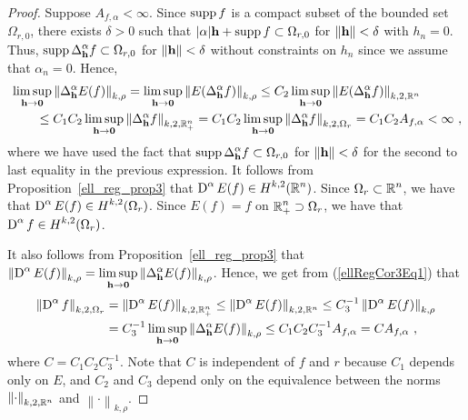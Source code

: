 \begin{proof}
 Suppose $A_{f,\alpha} < \infty$.
Since $\operatorname{supp} f$ is a compact subset of the bounded set $\Omega_{r,0}$,
there exists $\delta >0$ such that
$|\alpha| \mathbf{h} + \operatorname{supp} f \subset \Omega_{r,0}$
for $\|\mathbf{h}\| < \delta$ with $h_n = 0$.  Thus,
$\displaystyle \operatorname{supp} \Delta^\alpha_{\mathbf{h}} f \subset \Omega_{r,0}$ for
$\|\mathbf{h}\| < \delta$ without constraints on $h_n$ since we assume
that $\alpha_n = 0$.  Hence,
\begin{align}
&\limsup_{\mathbf{h}\rightarrow \mathbf{0}}
  \left\| \Delta^\alpha_{\mathbf{h}} E(f)\right \|_{k,\rho}
= \limsup_{\mathbf{h}\rightarrow \mathbf{0}}
  \left\| E(\Delta^\alpha_{\mathbf{h}} f)\right \|_{k,\rho}
\leq C_2 \limsup_{\mathbf{h}\rightarrow \mathbf{0}}
\left\| E(\Delta^\alpha_{\mathbf{h}} f)\right \|_{k,2,\mathbb{R}^n} \nonumber \\
&\qquad \leq C_1 C_2 \limsup_{\mathbf{h}\rightarrow \mathbf{0}}
\left\| \Delta^\alpha_{\mathbf{h}} f\right \|_{k,2,\mathbb{R}^n_+}
= C_1 C_2 \limsup_{\mathbf{h}\rightarrow \mathbf{0}}
\left\| \Delta^\alpha_{\mathbf{h}} f\right \|_{k,2,\Omega_r}
= C_1 C_2 A_{f,\alpha} < \infty \ ,
\label{ellRegCor3Eq1}
\end{align}
where we have used the fact that
$\displaystyle \operatorname{supp} \Delta^\alpha_{\mathbf{h}} f \subset \Omega_{r,0}$
for $\|\mathbf{h}\| < \delta$ for the second to last equality in the
previous expression.
It follows from Proposition~\ref{ell_reg_prop3} that 
$\displaystyle \operatorname{D}^\alpha E(f) \in H^{k,2}(\mathbb{R}^n)$.
Since $\displaystyle \Omega_r \subset \mathbb{R}^n$, we have that
$\displaystyle \operatorname{D}^\alpha E(f) \in H^{k,2}(\Omega_r)$.  Since
$E(f) = f$ on $\displaystyle \mathbb{R}^n_+ \supset \Omega_r$, we have that
$\displaystyle \operatorname{D}^\alpha f \in H^{k,2}(\Omega_r)$.

 It also follows from Proposition~\ref{ell_reg_prop3}
that $\displaystyle \left\|\operatorname{D}^\alpha E(f)\right\|_{k,\rho}
= \limsup_{\mathbf{h}\rightarrow \mathbf{0}}
\left\| \Delta^\alpha_{\mathbf{h}} E(f)\right \|_{k,\rho}$.
Hence, we get from (\ref{ellRegCor3Eq1}) that
\begin{align*}
\left\|\operatorname{D}^\alpha f\right\|_{k,2,\Omega_r}
&= \left\| \operatorname{D}^\alpha E(f) \right\|_{k,2,\mathbb{R}^n_+}
\leq \left\|\operatorname{D}^\alpha E(f)\right\|_{k,2,\mathbb{R}^n}
\leq C_3^{-1} \left\|\operatorname{D}^\alpha E(f)\right\|_{k,\rho} \\
&= C_3^{-1} \limsup_{\mathbf{h}\rightarrow \mathbf{0}}
\left\| \Delta^\alpha_{\mathbf{h}} E(f)\right \|_{k,\rho}
\leq C_1 C_2 C_3^{-1} A_{f,\alpha}
= C A_{f,\alpha} \ ,
\end{align*}
where $C= C_1 C_2 C_3^{-1}$.  Note that $C$ is independent of $f$ and $r$
because $C_1$ depends only on $E$, and $C_2$ and $C_3$ depend only on
the equivalence between the norms
$\displaystyle \left\|\cdot\right\|_{k,2,\mathbb{R}^n}$ and 
$\displaystyle \left\|\cdot\right\|_{k,\rho}$.
\end{proof}

